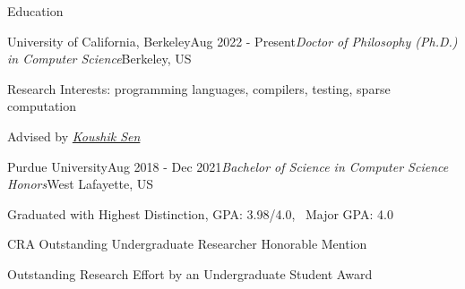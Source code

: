 \documentclass{resume} %
\begin{document}
 

\vspace{-8.0em}
\begin{rSection}{Education}
\begin{rSubsection}{University of California, Berkeley}{Aug 2022 - Present}{\textit{Doctor of Philosophy (Ph.D.) in Computer Science}}{Berkeley, US}
    \item Research Interests: programming languages, compilers, testing, sparse computation
    \item Advised by \href{https://people.eecs.berkeley.edu/~ksen/}{\textit{Koushik Sen}}
\end{rSubsection}

\begin{rSubsection}{Purdue University}{Aug 2018 - Dec 2021}{\textit{Bachelor of Science in Computer Science Honors}}{West Lafayette, US}
\item Graduated with Highest Distinction, GPA: 3.98/4.0, \ Major GPA: 4.0
\item CRA Outstanding Undergraduate Researcher Honorable Mention
\item Outstanding Research Effort by an Undergraduate Student Award
\end{rSubsection}

\end{rSection}
\end{document}
